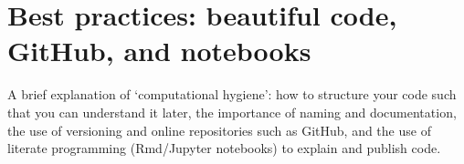 \section{Best practices: beautiful code, GitHub, and notebooks}
\label{sec:practices}


A brief explanation of ‘computational hygiene’: how to structure your code such that you can understand it later, the importance of naming and documentation, the use of versioning and online repositories such as GitHub, and the use of literate programming (Rmd/Jupyter notebooks) to explain and publish code. 